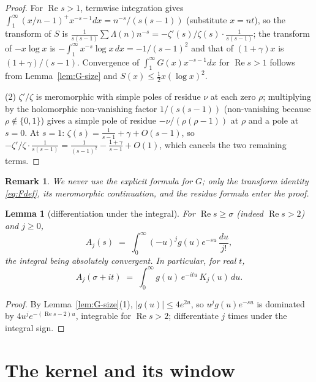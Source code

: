 \documentclass[11pt]{amsart}
\newtheorem{lemma}[theorem]{Lemma}
\newtheorem{remark}[theorem]{Remark}
\numberwithin{equation}{section}
\newcommand{\re}{\operatorname{Re}}
\newcommand{\Sig}{\sigma}
\newcommand{\Lam}{\Lambda}
\newcommand{\Euler}{\gamma}
\begin{document}
\begin{proof}
For $\re s > 1$, termwise integration gives
$\int_1^\infty (x/n-1)^+ x^{-s-1}dx = n^{-s}/(s(s-1))$ (substitute
$x = nt$), so the transform of $S$ is
$\frac{1}{s(s-1)}\sum \Lam(n)n^{-s} = -\zeta'(s)/\zeta(s) \cdot
\frac{1}{s(s-1)}$; the transform of $-x\log x$ is $-\int_1^\infty
x^{-s}\log x \,dx = -1/(s-1)^2$ and that of $(1+\Euler)x$ is
$(1+\Euler)/(s-1)$. Convergence of $\int_1^\infty G(x)x^{-s-1}dx$ for
$\re s > 1$ follows from Lemma~\ref{lem:G-size} and
$S(x) \le \tfrac12 x(\log x)^2$.

(2) $\zeta'/\zeta$ is meromorphic with simple poles of residue $\nu$ at
each zero $\rho$; multiplying by the holomorphic non-vanishing factor
$1/(s(s-1))$ (non-vanishing because $\rho \notin \{0,1\}$) gives a simple
pole of residue $-\nu/(\rho(\rho-1))$ at $\rho$ and a pole at $s=0$.
At $s = 1$: $\zeta(s) = \frac{1}{s-1} + \Euler + O(s-1)$, so
$-\zeta'/\zeta \cdot \frac{1}{s(s-1)} = \frac{1}{(s-1)^2} -
\frac{1+\Euler}{s-1} + O(1)$, which cancels the two remaining terms.
\end{proof}

\begin{remark}
We never use the explicit formula for $G$; only the transform identity
\eqref{eq:Fdef}, its meromorphic continuation, and the residue formula
enter the proof.
\end{remark}

\begin{lemma}[differentiation under the integral]\label{lem:diff}
For $\re s \ge \Sig$ (indeed $\re s > 2$) and $j \ge 0$,
\[
A_j(s) \;=\; \int_0^\infty (-u)^j g(u) e^{-su}\,\frac{du}{j!},
\]
the integral being absolutely convergent. In particular, for real $t$,
\begin{equation}\label{eq:Atau}
A_j(\Sig + it) \;=\; \int_0^\infty g(u)\, e^{-itu}\, K_j(u)\,du.
\end{equation}
\end{lemma}

\begin{proof}
By Lemma~\ref{lem:G-size}(1), $|g(u)| \le 4e^{2u}$, so
$u^j g(u) e^{-su}$ is dominated by $4u^j e^{-(\re s - 2)u}$, integrable
for $\re s > 2$; differentiate $j$ times under the integral sign.
\end{proof}

\section{The kernel and its window}\label{sec:kernel}
\end{document}
